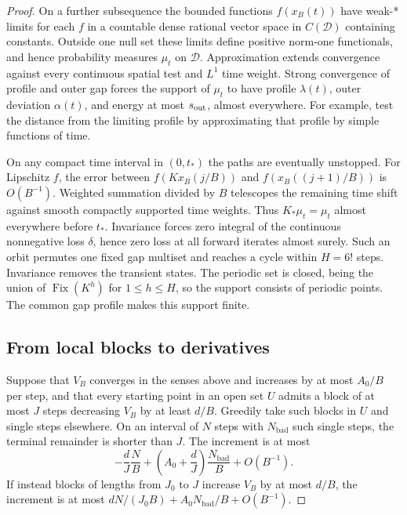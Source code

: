\documentclass[11pt,reqno]{amsart}
\theoremstyle{remark}
\newcommand{\Fix}{\operatorname{Fix}}
\begin{document}
\begin{proof}
On a further subsequence the bounded functions \(f(x_B(t))\) have weak-* limits for each \(f\) in a countable dense rational vector space in \(C(\mathcal D)\) containing constants. Outside one null set these limits define positive norm-one functionals, and hence probability measures \(\mu_t\) on \(\mathcal D\). Approximation extends convergence against every continuous spatial test and \(L^1\) time weight. Strong convergence of profile and outer gap forces the support of \(\mu_t\) to have profile \(\lambda(t)\), outer deviation \(\alpha(t)\), and energy at most \(s_{\rm out}\), almost everywhere. For example, test the distance from the limiting profile by approximating that profile by simple functions of time.

On any compact time interval in \((0,t_*)\) the paths are eventually unstopped. For Lipschitz \(f\), the error between \(f(Kx_B(j/B))\) and \(f(x_B((j+1)/B))\) is \(O(B^{-1})\). Weighted summation divided by \(B\) telescopes the remaining time shift against smooth compactly supported time weights. Thus \(K_*\mu_t=\mu_t\) almost everywhere before \(t_*\). Invariance forces zero integral of the continuous nonnegative loss \(\delta\), hence zero loss at all forward iterates almost surely. Such an orbit permutes one fixed gap multiset and reaches a cycle within \(H=6!\) steps. Invariance removes the transient states. The periodic set is closed, being the union of \(\Fix(K^h)\) for \(1\le h\le H\), so the support consists of periodic points. The common gap profile makes this support finite.

\subsection{From local blocks to derivatives}\label{sec:blocks}
Suppose that \(V_B\) converges in the senses above and increases by at most \(A_0/B\) per step, and that every starting point in an open set \(U\) admits a block of at most \(J\) steps decreasing \(V_B\) by at least \(d/B\). Greedily take such blocks in \(U\) and single steps elsewhere. On an interval of \(N\) steps with \(N_{\mathrm{bad}}\) such single steps, the terminal remainder is shorter than \(J\). The increment is at most
\begin{equation}\label{eq:greedy}
 -\frac{d}{J}\frac NB+
 \left(A_0+\frac dJ\right)\frac{N_{\mathrm{bad}}}B+O(B^{-1}).
\end{equation}
If instead blocks of lengths from \(J_0\) to \(J\) increase \(V_B\) by at most \(d/B\), the increment is at most \(dN/(J_0B)+A_0N_{\mathrm{bad}}/B+O(B^{-1})\).


\end{proof}
\end{document}
